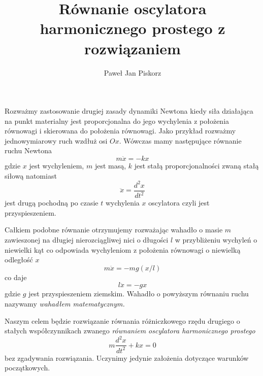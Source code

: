 \documentclass[12pt,a4paper,pl,fleqn]{article}
\title{Równanie oscylatora harmonicznego prostego z rozwiązaniem}
\author{Paweł Jan Piskorz}
\date{}
\begin{document}
\maketitle

Rozważmy zastosowanie drugiej zasady dynamiki Newtona kiedy siła działająca
na punkt materialny jest proporcjonalna do jego wychylenia z położenia
równowagi i skierowana do położenia równowagi. Jako przykład rozważmy jednowymiarowy ruch
wzdłuż osi $Ox$\@. Wówczas mamy następujące równanie ruchu Newtona
\begin{equation}
m \ddot{x} = - k x
\end{equation}
gdzie $x$ jest wychyleniem, $m$ jest masą, $k$ jest stałą proporcjonalności zwaną stałą siłową natomiast
\begin{equation}
\ddot{x} = \frac{d^2 x}{d t^2}
\end{equation}
jest drugą pochodną po czasie $t$ wychylenia $x$ oscylatora czyli jest przyspieszeniem.

Całkiem podobne równanie otrzymujemy rozważając wahadło o masie $m$ zawieszonej na długiej nierozciągliwej nici o długości $l$
w przybliżeniu wychyleń o niewielki kąt co odpowiada wychyleniom z położenia równowagi o niewielką odległość $x$
\begin{equation}
m \ddot{x} = - m g (x / l)
\end{equation}
co daje
\begin{equation}
l \ddot{x} = - g x
\end{equation}
gdzie $g$ jest przyspieszeniem ziemskim.
Wahadło o powyższym równaniu ruchu nazywamy {\em wahadłem matematycznym.}

Naszym celem będzie rozwiązanie równania różniczkowego rzędu drugiego o stałych współczynnikach zwanego
{\em równaniem oscylatora harmonicznego prostego\/}
\begin{equation}
\label{eq:harmonic_oscillator_equation}
m \frac{d^2 x}{d t^2} + k x = 0
\end{equation}
bez zgadywania rozwiązania.
Uczynimy jedynie założenia dotyczące warunków początkowych.
\end{document}
